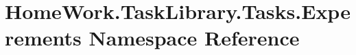 \hypertarget{namespace_home_work_1_1_task_library_1_1_tasks_1_1_experements}{}\section{Home\+Work.\+Task\+Library.\+Tasks.\+Experements Namespace Reference}
\label{namespace_home_work_1_1_task_library_1_1_tasks_1_1_experements}
